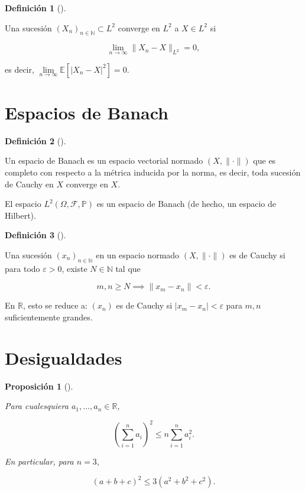 \documentclass[
  spanish,
  us-letterpaper,
]{scrreprt}
\theoremstyle{plain}
\theoremstyle{plain}
\theoremstyle{plain}
\newtheorem{proposition}{Proposición}[chapter]
\theoremstyle{definition}
\newtheorem{definition}{Definición}[chapter]
\theoremstyle{remark}
\begin{document}
\begin{definition}[]\protect\hypertarget{def-conv_l2}{}\label{def-conv_l2}

Una sucesión \((X_n)_{n \in \mathbb{N}} \subset L^2\) converge en
\(L^2\) a \(X \in L^2\) si

\[
\lim_{n \to \infty} \|X_n - X\|_{L^2} = 0,
\]

es decir, \(\lim\limits_{n \to \infty} \mathbb{E}[|X_n - X|^2] = 0\).

\end{definition}

\section{Espacios de Banach}\label{espacios-de-banach}

\begin{definition}[]\protect\hypertarget{def-esp_banach}{}\label{def-esp_banach}

Un espacio de Banach es un espacio vectorial normado \((X, \|\cdot\|)\)
que es completo con respecto a la métrica inducida por la norma, es
decir, toda sucesión de Cauchy en \(X\) converge en \(X\).

\end{definition}

El espacio \(L^2(\Omega, \mathcal{F}, \mathbb{P})\) es un espacio de
Banach (de hecho, un espacio de Hilbert).

\begin{definition}[]\protect\hypertarget{def-criterio_cauchy_esp_norm}{}\label{def-criterio_cauchy_esp_norm}

Una sucesión \((x_n)_{n \in \mathbb{N}}\) en un espacio normado
\((X, \|\cdot\|)\) es de Cauchy si para todo \(\varepsilon > 0\), existe
\(N \in \mathbb{N}\) tal que

\[
m, n \geq N \implies \|x_m - x_n\| < \varepsilon.
\]

\end{definition}

En \(\mathbb{R}\), esto se reduce a: \((x_n)\) es de Cauchy si
\(|x_m - x_n| < \varepsilon\) para \(m, n\) suficientemente grandes.

\section{Desigualdades}\label{desigualdades}

\begin{proposition}[]\protect\hypertarget{prp-des_triangulo}{}\label{prp-des_triangulo}

Para cualesquiera \(a_1, \dots, a_n \in \mathbb{R}\),

\[
\left( \sum_{i=1}^n a_i \right)^2 \leq n \sum_{i=1}^n a_i^2.
\]

En particular, para \(n = 3\),

\[
(a + b + c)^2 \leq 3(a^2 + b^2 + c^2).
\]

\end{proposition}
\end{document}

